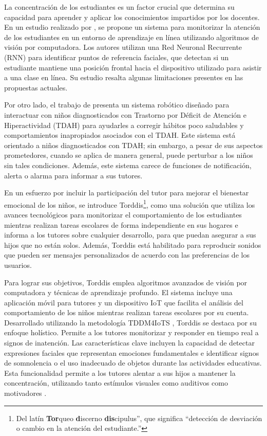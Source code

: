 \documentclass[a4paper,fleqn]{cas-sc}
\begin{document}
	La concentración de los estudiantes es un factor crucial que determina su capacidad para aprender y aplicar los conocimientos impartidos por los docentes. En un estudio realizado por \cite{Terraza2022}, se propone un sistema para monitorizar la atención de los estudiantes en un entorno de aprendizaje en línea utilizando algoritmos de visión por computadora. Los autores utilizan una Red Neuronal Recurrente (RNN) para identificar puntos de referencia faciales, que detectan si un estudiante mantiene una posición frontal hacia el dispositivo utilizado para asistir a una clase en línea. Su estudio resalta algunas limitaciones presentes en las propuestas actuales.
	
	Por otro lado, el trabajo de \cite{Berrezueta-Guzman2021} presenta un sistema robótico diseñado para interactuar con niños diagnosticados con Trastorno por Déficit de Atención e Hiperactividad (TDAH) para ayudarles a corregir hábitos poco saludables y comportamientos inapropiados asociados con el TDAH. Este sistema está orientado a niños diagnosticados con TDAH; sin embargo, a pesar de sus aspectos prometedores, cuando se aplica de manera general, puede perturbar a los niños sin tales condiciones. Además, este sistema carece de funciones de notificación, alerta o alarma para informar a sus tutores.
	
	En un esfuerzo por incluir la participación del tutor para mejorar el bienestar emocional de los niños, se introduce Torddis\footnote{Del latín \textbf{Tor}queo \textbf{d}iscerno \textbf{dis}cipulus'', que significa ``detección de desviación o cambio en la atención del estudiante.''}, como una solución que utiliza los avances tecnológicos para monitorizar el comportamiento de los estudiantes mientras realizan tareas escolares de forma independiente en sus hogares e informa a los tutores sobre cualquier desarrollo, para que puedan asegurar a sus hijos que no están solos. Además, Torddis está habilitado para reproducir sonidos que pueden ser mensajes personalizados de acuerdo con las preferencias de los usuarios.
	
	Para lograr sus objetivos, Torddis emplea algoritmos avanzados de visión por computadora y técnicas de aprendizaje profundo. El sistema incluye una aplicación móvil para tutores y un dispositivo IoT que facilita el análisis del comportamiento de los niños mientras realizan tareas escolares por su cuenta. Desarrollado utilizando la metodología TDDM4IoTS \citep{Guerrero-Ulloa2020TDDM4IoTS}, Torddis se destaca por su enfoque holístico. Permite a los tutores monitorizar y responder en tiempo real a signos de inatención. Las características clave incluyen la capacidad de detectar expresiones faciales que representan emociones fundamentales e identificar signos de somnolencia o el uso inadecuado de objetos durante las actividades educativas. Esta funcionalidad permite a los tutores alentar a sus hijos a mantener la concentración, utilizando tanto estímulos visuales como auditivos como motivadores \citep{Al-Gburi2023,Enadula2021,Terraza2022}.
	
\end{document}
